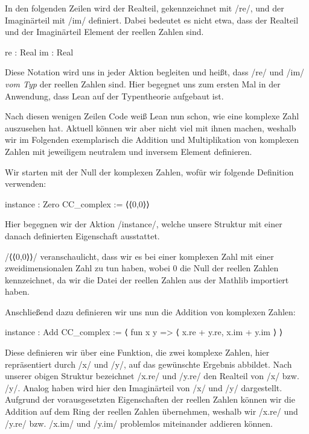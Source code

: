\documentclass[10pt]{article}
\begin{document}

\noindent In den folgenden Zeilen wird der Realteil, gekennzeichnet mit \lean/re/, und der Imaginärteil mit \lean/im/ definiert. Dabei bedeutet es nicht etwa, dass der Realteil und der Imaginärteil Element der reellen Zahlen sind.
\vspace{-0.1cm}
\begin{leancode}
  re : Real
  im : Real  
\end{leancode}
\vspace{-0.1cm}
\noindent  Diese Notation wird uns in jeder Aktion begleiten und heißt, dass \lean/re/ und \lean/im/ \emph{vom Typ} der reellen Zahlen sind. Hier begegnet uns zum ersten Mal in der Anwendung, dass Lean auf der Typentheorie aufgebaut ist.

\noindent Nach diesen wenigen Zeilen Code weiß Lean nun schon, wie eine komplexe Zahl auszusehen hat. Aktuell können wir aber nicht viel mit ihnen machen, weshalb wir im Folgenden exemplarisch die Addition und Multiplikation von komplexen Zahlen mit jeweiligem neutralem und inversem Element definieren.\par

\noindent Wir starten mit der Null der komplexen Zahlen, wofür wir folgende Definition verwenden:
\vspace{-0.1cm}
\begin{leancode}
instance : Zero CC_complex :=
    ⟨⟨0,0⟩⟩
\end{leancode}
\vspace{-0.1cm}
Hier begegnen wir der Aktion \lean/instance/, welche unsere Struktur mit einer danach definierten Eigenschaft ausstattet. \par

\noindent \lean/⟨⟨0,0⟩⟩/ veranschaulicht, dass wir es bei einer komplexen Zahl mit einer zweidimensionalen Zahl zu tun haben, wobei $0$ die Null der reellen Zahlen kennzeichnet, da wir die Datei der reellen Zahlen aus der Mathlib importiert haben.

\noindent Anschließend dazu definieren wir uns nun die Addition von komplexen Zahlen:
\vspace{-0.1cm}
\begin{leancode}
instance : Add CC_complex :=
  ⟨ fun x y  =>  ⟨ x.re + y.re, x.im + y.im ⟩ ⟩
\end{leancode}
\vspace{-0.1cm}
Diese definieren wir über eine Funktion, die zwei komplexe Zahlen, hier repräsentiert durch \lean/x/ und \lean/y/, auf das gewünschte Ergebnis abbildet. Nach unserer obigen Struktur bezeichnet \lean/x.re/ und \lean/y.re/ den Realteil von \lean/x/ bzw. \lean/y/. Analog haben wird hier den Imaginärteil von \lean/x/ und \lean/y/ dargestellt. Aufgrund der vorausgesetzten Eigenschaften der reellen Zahlen können wir die Addition auf dem Ring der reellen Zahlen übernehmen, weshalb wir \lean/x.re/ und \lean/y.re/ bzw. \lean/x.im/ und \lean/y.im/ problemlos miteinander addieren können.
\end{document}

